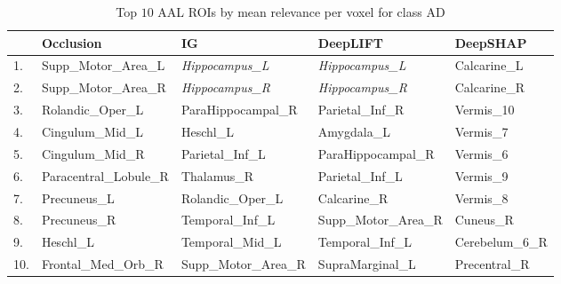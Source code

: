 \begin{table}
	\centering
	\footnotesize
	\begin{tabularx}{\textwidth}{lXXXX}
		\toprule
		    & Occlusion              & IG                    & DeepLIFT              & DeepSHAP        \\
		\midrule
		1.  & Supp\_Motor\_Area\_L   & \emph{Hippocampus\_L} & \emph{Hippocampus\_L} & Calcarine\_L    \\
		2.  & Supp\_Motor\_Area\_R   & \emph{Hippocampus\_R} & \emph{Hippocampus\_R} & Calcarine\_R    \\
		3.  & Rolandic\_Oper\_L      & ParaHippocampal\_R    & Parietal\_Inf\_R      & Vermis\_10      \\
		4.  & Cingulum\_Mid\_L       & Heschl\_L             & Amygdala\_L           & Vermis\_7       \\
		5.  & Cingulum\_Mid\_R       & Parietal\_Inf\_L      & ParaHippocampal\_R    & Vermis\_6       \\
		6.  & Paracentral\_Lobule\_R & Thalamus\_R           & Parietal\_Inf\_L      & Vermis\_9       \\
		7.  & Precuneus\_L           & Rolandic\_Oper\_L     & Calcarine\_R          & Vermis\_8       \\
		8.  & Precuneus\_R           & Temporal\_Inf\_L      & Supp\_Motor\_Area\_R  & Cuneus\_R       \\
		9.  & Heschl\_L              & Temporal\_Mid\_L      & Temporal\_Inf\_L      & Cerebelum\_6\_R \\
		10. & Frontal\_Med\_Orb\_R   & Supp\_Motor\_Area\_R  & SupraMarginal\_L      & Precentral\_R   \\
		\bottomrule
	\end{tabularx}
	\caption*{Top $10$ AAL ROIs by mean relevance per voxel for class AD}\label{tab:top10-mean}
\end{table}
